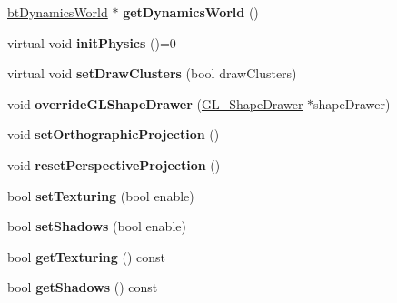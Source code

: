 \begin{DoxyCompactItemize}
\item 
\hypertarget{class_demo_application_ac466ff67fa337bfaf79d0f271a5cbcfd}{\hyperlink{classbt_dynamics_world}{bt\+Dynamics\+World} $\ast$ {\bfseries get\+Dynamics\+World} ()}\label{class_demo_application_ac466ff67fa337bfaf79d0f271a5cbcfd}

\item 
\hypertarget{class_demo_application_a17e70afea6e3d3ebaae6fc81c76fe6f4}{virtual void {\bfseries init\+Physics} ()=0}\label{class_demo_application_a17e70afea6e3d3ebaae6fc81c76fe6f4}

\item 
\hypertarget{class_demo_application_a5d61d619f435c1b1d8e511bf60976181}{virtual void {\bfseries set\+Draw\+Clusters} (bool draw\+Clusters)}\label{class_demo_application_a5d61d619f435c1b1d8e511bf60976181}

\item 
\hypertarget{class_demo_application_a0d1c7f8527a04e5a5f6c6b3c61d8b7c7}{void {\bfseries override\+G\+L\+Shape\+Drawer} (\hyperlink{class_g_l___shape_drawer}{G\+L\+\_\+\+Shape\+Drawer} $\ast$shape\+Drawer)}\label{class_demo_application_a0d1c7f8527a04e5a5f6c6b3c61d8b7c7}

\item 
\hypertarget{class_demo_application_a15720b197fcaf1927878516989dd0733}{void {\bfseries set\+Orthographic\+Projection} ()}\label{class_demo_application_a15720b197fcaf1927878516989dd0733}

\item 
\hypertarget{class_demo_application_a58fb583f16fc40de5c46af14d7bb0fd7}{void {\bfseries reset\+Perspective\+Projection} ()}\label{class_demo_application_a58fb583f16fc40de5c46af14d7bb0fd7}

\item 
\hypertarget{class_demo_application_a7d6f4f62d0811ad90c1fc2b5d5a8bd06}{bool {\bfseries set\+Texturing} (bool enable)}\label{class_demo_application_a7d6f4f62d0811ad90c1fc2b5d5a8bd06}

\item 
\hypertarget{class_demo_application_a80fcb3018b11f9002368f866fb9c1777}{bool {\bfseries set\+Shadows} (bool enable)}\label{class_demo_application_a80fcb3018b11f9002368f866fb9c1777}

\item 
\hypertarget{class_demo_application_a4c40127b907094e2ad5c5ecb9f0d466a}{bool {\bfseries get\+Texturing} () const }\label{class_demo_application_a4c40127b907094e2ad5c5ecb9f0d466a}

\item 
\hypertarget{class_demo_application_a6a22ee86807c94de48bd4150c1d0a1fc}{bool {\bfseries get\+Shadows} () const }\label{class_demo_application_a6a22ee86807c94de48bd4150c1d0a1fc}


\end{DoxyCompactItemize}
